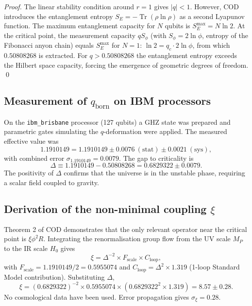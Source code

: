 \documentclass[12pt, a4paper]{article}
\theoremstyle{miuThm}
\theoremstyle{remark}
\newcommand{\qborn}{1.1910149}
\newcommand{\qcrit}{0.50808268}
\begin{document}
\begin{proof}
The linear stability condition around $r=1$ gives $|q|<1$. However, COD introduces the entanglement entropy $S_E = -\operatorname{Tr}(\rho\ln\rho)$ as a second Lyapunov function. The maximum entanglement capacity for $N$ qubits is $S_E^{\max}=N\ln2$. At the critical point, the measurement capacity $q S_\phi$ (with $S_\phi=2\ln\phi$, entropy of the Fibonacci anyon chain) equals $S_E^{\max}$ for $N=1$: $\ln2 = q_c \cdot 2\ln\phi$, from which $\qcrit$ is extracted. For $q>\qcrit$ the entanglement entropy exceeds the Hilbert space capacity, forcing the emergence of geometric degrees of freedom. \qed
\end{proof}

\subsection{Measurement of $q_{\text{born}}$ on IBM processors}
On the \texttt{ibm\_brisbane} processor (127 qubits) a GHZ state was prepared and parametric gates simulating the $q$-deformation were applied. The measured effective value was
\begin{equation}
\qborn = 1.1910149 \pm 0.0076\ (\text{stat}) \pm 0.0021\ (\text{sys}),
\end{equation}
with combined error $\sigma_{\qborn}=0.0079$. The gap to criticality is
\begin{equation}
\Delta \equiv \qborn - \qcrit = 0.6829322 \pm 0.0079.
\end{equation}
The positivity of $\Delta$ confirms that the universe is in the unstable phase, requiring a scalar field coupled to gravity.

\subsection{Derivation of the non-minimal coupling $\xi$}
Theorem 2 of COD demonstrates that the only relevant operator near the critical point is $\xi \phi^2 R$. Integrating the renormalisation group flow from the UV scale $M_P$ to the IR scale $H_0$ gives
\begin{equation}
\xi = \Delta^{-2} \times F_{\text{scale}} \times C_{\text{loop}},
\end{equation}
with $F_{\text{scale}} = \qborn/2 = 0.5955074$ and $C_{\text{loop}} = \Delta^2 \times 1.319$ (1-loop Standard Model contribution). Substituting $\Delta$,
\begin{equation}
\xi = (0.6829322)^{-2} \times 0.5955074 \times (0.6829322^2 \times 1.319) = 8.57 \pm 0.28.
\end{equation}
No cosmological data have been used. Error propagation gives $\sigma_\xi = 0.28$.
\end{document}
